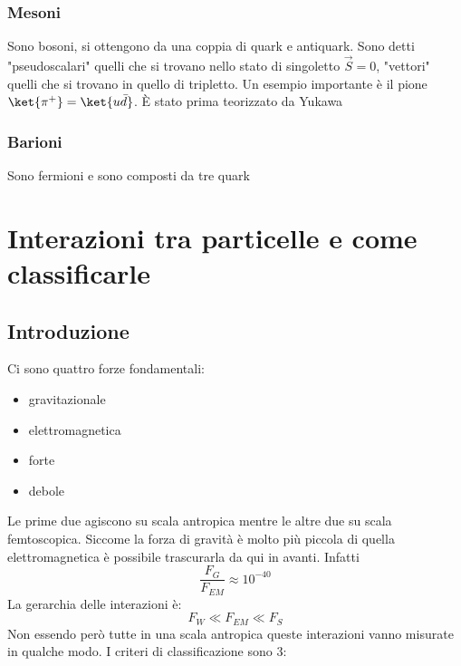\documentclass[12pt]{book}
\begin{document}
\subsubsection{Mesoni}
Sono bosoni, si ottengono da una coppia di quark e antiquark.
 Sono detti "pseudoscalari" quelli che si trovano nello stato di singoletto $\vec S=0$, "vettori" quelli che si trovano in quello di tripletto. Un esempio importante è il pione $\ket{\pi^+} = \ket{u \bar d}$. È stato prima teorizzato da Yukawa 

\subsubsection{Barioni}
Sono fermioni e sono composti da tre quark





\newpage
\section{Interazioni tra particelle e come classificarle}
\toc
\subsection{Introduzione}
Ci sono quattro forze fondamentali:
\begin{itemize}
	\item gravitazionale
	\item elettromagnetica
	\item forte
	\item debole
\end{itemize}
Le prime due agiscono su scala antropica mentre le altre due su scala femtoscopica. Siccome la forza di gravità è molto più piccola di quella elettromagnetica è possibile trascurarla da qui in avanti. Infatti
\begin{equation}
	\frac{F_G}{F_{EM}} \approx 10^{-40}
\end{equation}
La gerarchia delle interazioni è:
\begin{equation}
	F_W \ll F_{EM} \ll F_S
\end{equation}
Non essendo però tutte in una scala antropica queste interazioni vanno misurate in qualche modo. I criteri di classificazione sono 3:
\end{document}
